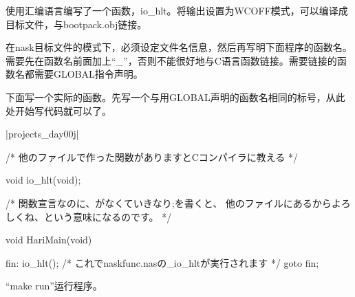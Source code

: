 使用汇编语言编写了一个函数，io\_hlt。将输出设置为WCOFF模式，可以编译成目标文件，与bootpack.obj链接。

在nask目标文件的模式下，必须设定文件名信息，然后再写明下面程序的函数名。需要先在函数名前面加上“\_”，否则不能很好地与C语言函数链接。需要链接的函数名都需要GLOBAL指令声明。

下面写一个实际的函数。先写一个与用GLOBAL声明的函数名相同的标号，从此处开始写代码就可以了。

\dag|projects_day\harib00j|
\begin{code}[label=bootpack.c]
/* 他のファイルで作った関数がありますとCコンパイラに教える */

void io_hlt(void);

/* 関数宣言なのに、{}がなくていきなり;を書くと、
	他のファイルにあるからよろしくね、という意味になるのです。 */

void HariMain(void)
{

fin:
	io_hlt(); /* これでnaskfunc.nasの_io_hltが実行されます */
	goto fin;

}
\end{code}


“make run”运行程序。
